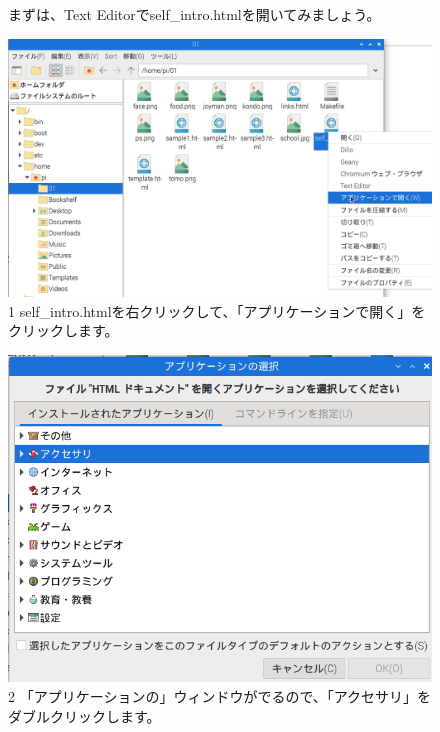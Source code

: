 \begin{figure}[ht]
  \begin{minipage}{\textwidth}
    \flushleft
    まずは、Text
    Editorでself\_intro.htmlを開いてみましょう。
    \begin{minipage}{0.45\linewidth}
      \includegraphics[width=\linewidth]{text01-img/textbook-img1040.png}\\
      1 self\_intro.htmlを右クリックして、「アプリケーションで開く」をクリックします。
    \end{minipage}
    \hfill
    \vspace{20pt}
    \begin{minipage}{0.45\linewidth}
      \includegraphics[width=\linewidth]{text01-img/textbook-img1041.png}\\
      2 「アプリケーションの」ウィンドウがでるので、「アクセサリ」をダブルクリックします。
    \end{minipage}

\end{minipage}
\end{figure}
